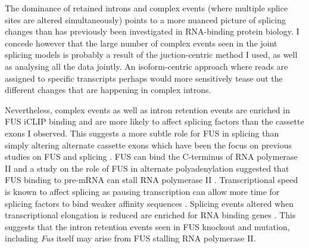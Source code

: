 The dominance of retained introns and complex events (where multiple splice sites are altered simultaneously) points to a more nuanced picture of splicing changes than has previously been investigated in RNA-binding protein biology.
I concede however that the large number of complex events seen in the joint splicing models is probably a result of the juction-centric method I used, as well as analysing all the data jointly. 
An isoform-centric approach where reads are assigned to specific transcripts \citep{Trapnell2010,Bray2016} perhaps would more sensitively tease out the different changes that are happening in complex introns.


Nevertheless, complex events as well as intron retention events are enriched in FUS iCLIP binding and are more likely to affect splicing factors than the cassette exons I observed. 
This suggests a more subtle role for FUS in splicing than simply altering alternate cassette exons which have been the focus on previous studies on FUS and splicing \citep{Rogelj2012,Lagier-Tourenne2012,Ishigaki2012,Honda2014,Scekic-zahirovic2016}.
FUS can bind the C-terminus of RNA polymerase II \citep{Schwartz2012} and a study on the role of FUS in alternate polyadenylation suggested that FUS binding to pre-mRNA can stall RNA polymerase II \citep{Masuda2015}. 
Transcriptional speed is known to affect splicing as pausing transcription can allow more time for splicing factors to bind weaker affinity sequences \citep{Kornblihtt2004a}. 
Splicing events altered when transcriptional elongation is reduced are enriched for RNA binding genes \citep{Ip2011}. 
This suggests that the intron retention events seen in FUS knockout and mutation, including \textit{Fus} itself may arise from FUS stalling RNA polymerase II.

